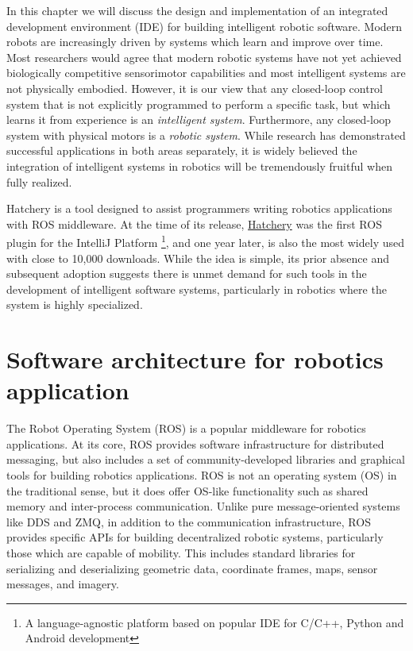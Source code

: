 \documentclass[12pt,initial,twoside,maitrise]{dms}
\numberwithin{equation}{section}
\numberwithin{table}{chapter}
\numberwithin{figure}{chapter}
\begin{document}
In this chapter we will discuss the design and implementation of an integrated development environment (IDE) for building intelligent robotic software. Modern robots are increasingly driven by systems which learn and improve over time. Most researchers would agree that modern robotic systems have not yet achieved biologically competitive sensorimotor capabilities and most intelligent systems are not physically embodied. However, it is our view that any closed-loop control system that is not explicitly programmed to perform a specific task, but which learns it from experience is an \textit{intelligent system}. Furthermore, any closed-loop system with physical motors is a \textit{robotic system}. While research has demonstrated successful applications in both areas separately, it is widely believed the integration of intelligent systems in robotics will be tremendously fruitful when fully realized.

Hatchery is a tool designed to assist programmers writing robotics applications with ROS middleware. At the time of its release, \href{https://github.com/duckietown/hatchery}{Hatchery} was the first ROS plugin for the IntelliJ Platform \footnote{A language-agnostic platform based on popular IDE for C/C++, Python and Android development}, and one year later, is also the most widely used with close to 10,000 downloads. While the idea is simple, its prior absence and subsequent adoption suggests there is unmet demand for such tools in the development of intelligent software systems, particularly in robotics where the system is highly specialized.

\section{Software architecture for robotics application}

The Robot Operating System (ROS) is a popular middleware for robotics applications. At its core, ROS provides software infrastructure for distributed messaging, but also includes a set of community-developed libraries and graphical tools for building robotics applications. ROS is not an operating system (OS) in the traditional sense, but it does offer OS-like functionality such as shared memory and inter-process communication. Unlike pure message-oriented systems like DDS and ZMQ, in addition to the communication infrastructure, ROS provides specific APIs for building decentralized robotic systems, particularly those which are capable of mobility. This includes standard libraries for serializing and deserializing geometric data, coordinate frames, maps, sensor messages, and imagery.
\end{document}
